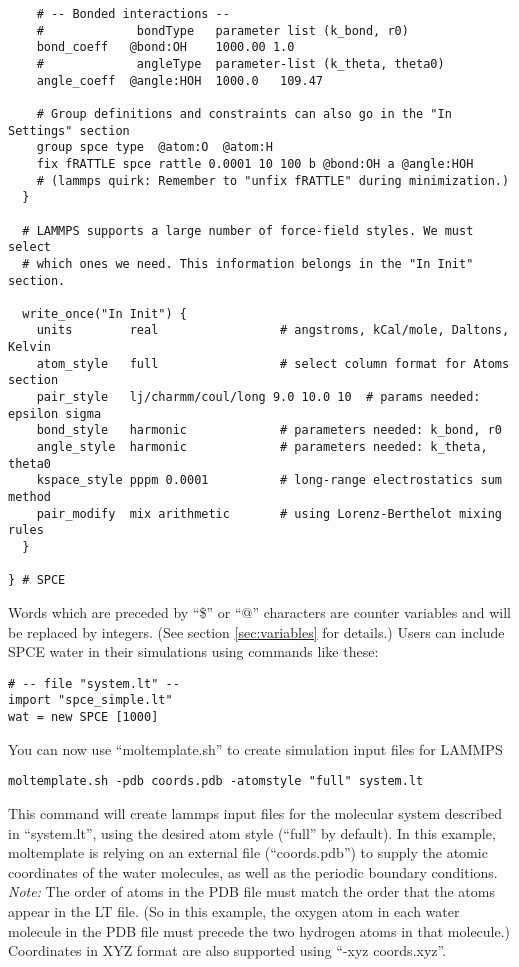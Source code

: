 \documentclass[11pt]{article}
\begin{document}
\begin{verbatim}
    # -- Bonded interactions --
    #             bondType   parameter list (k_bond, r0)
    bond_coeff   @bond:OH    1000.00 1.0 
    #             angleType  parameter-list (k_theta, theta0)
    angle_coeff  @angle:HOH  1000.0   109.47

    # Group definitions and constraints can also go in the "In Settings" section
    group spce type  @atom:O  @atom:H
    fix fRATTLE spce rattle 0.0001 10 100 b @bond:OH a @angle:HOH
    # (lammps quirk: Remember to "unfix fRATTLE" during minimization.)
  }

  # LAMMPS supports a large number of force-field styles. We must select
  # which ones we need. This information belongs in the "In Init" section.

  write_once("In Init") {
    units        real                 # angstroms, kCal/mole, Daltons, Kelvin
    atom_style   full                 # select column format for Atoms section
    pair_style   lj/charmm/coul/long 9.0 10.0 10  # params needed: epsilon sigma
    bond_style   harmonic             # parameters needed: k_bond, r0
    angle_style  harmonic             # parameters needed: k_theta, theta0
    kspace_style pppm 0.0001          # long-range electrostatics sum method
    pair_modify  mix arithmetic       # using Lorenz-Berthelot mixing rules
  }

} # SPCE
\end{verbatim}
Words which are preceded by ``\$'' or ``@'' characters 
are counter variables and will be replaced by integers. 
(See section \ref{sec:variables} for details.)
Users can include SPCE water in their simulations using commands like these:
\begin{verbatim}
# -- file "system.lt" --
import "spce_simple.lt"
wat = new SPCE [1000]
\end{verbatim}
You can now use ``moltemplate.sh'' to create simulation input files for LAMMPS
\begin{verbatim}
moltemplate.sh -pdb coords.pdb -atomstyle "full" system.lt
\end{verbatim}
This command will create lammps input files 
for the molecular system described in ``system.lt'',
using the desired atom style (``full'' by default).
In this example, moltemplate is relying on an external file (``coords.pdb'')
to supply the atomic coordinates of the water molecules, as well as
the periodic boundary conditions.  \textit{Note:} The order of atoms in
the PDB file must match the order that the atoms appear in the LT file.
(So in this example, the oxygen atom in each water molecule in the PDB file
 must precede the two hydrogen atoms in that molecule.)
Coordinates in XYZ format are also supported using ``-xyz coords.xyz''. 
\end{document}
